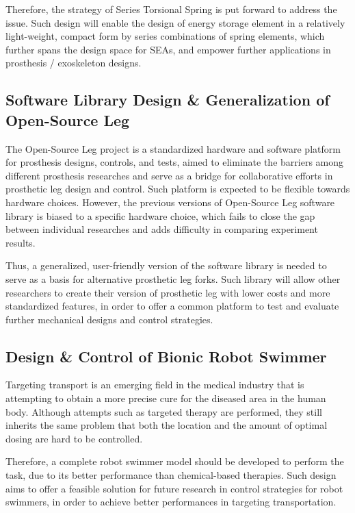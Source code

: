 \documentclass[8pt]{article}
\begin{document}

    Therefore, the strategy of Series Torsional Spring is put forward to address the issue. Such design will enable the design of energy storage element in a relatively light-weight, compact form by series combinations of spring elements, which further spans the design space for SEAs, and empower further applications in prosthesis / exoskeleton designs. 


    \subsection{Software Library Design \& Generalization of Open-Source Leg}   \label{sec:OSL-Library}

    The Open-Source Leg project is a standardized hardware and software platform for prosthesis designs, controls, and tests, aimed to eliminate the barriers among different prosthesis researches and serve as a bridge for collaborative efforts in prosthetic leg design and control. Such platform is expected to be flexible towards hardware choices. However, the previous versions of Open-Source Leg software library is biased to a specific hardware choice, which fails to close the gap between individual researches and adds difficulty in comparing experiment results. 

    Thus, a generalized, user-friendly version of the software library is needed to serve as a basis for alternative prosthetic leg forks. Such library will allow other researchers to create their version of prosthetic leg with lower costs and more standardized features, in order to offer a common platform to test and evaluate further mechanical designs and control strategies.

    \subsection{Design \& Control of Bionic Robot Swimmer}  \label{sec:RobotSwimmer}

    Targeting transport is an emerging field in the medical industry that is attempting to obtain a more precise cure for the diseased area in the human body. Although attempts such as targeted therapy are performed, they still inherits the same problem that both the location and the amount of optimal dosing are hard to be controlled. 

    Therefore, a complete robot swimmer model should be developed to perform the task, due to its better performance than chemical-based therapies. Such design aims to offer a feasible solution for future research in control strategies for robot swimmers, in order to achieve better performances in targeting transportation. 
    
\end{document}
